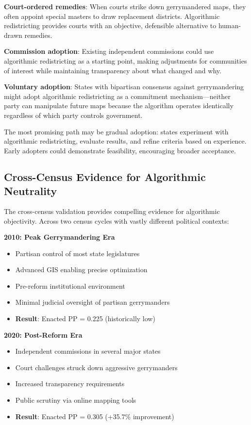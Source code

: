 \textbf{Court-ordered remedies}: When courts strike down gerrymandered maps, they often appoint special masters to draw replacement districts. Algorithmic redistricting provides courts with an objective, defensible alternative to human-drawn remedies.

\textbf{Commission adoption}: Existing independent commissions could use algorithmic redistricting as a starting point, making adjustments for communities of interest while maintaining transparency about what changed and why.

\textbf{Voluntary adoption}: States with bipartisan consensus against gerrymandering might adopt algorithmic redistricting as a commitment mechanism—neither party can manipulate future maps because the algorithm operates identically regardless of which party controls government.

The most promising path may be gradual adoption: states experiment with algorithmic redistricting, evaluate results, and refine criteria based on experience. Early adopters could demonstrate feasibility, encouraging broader acceptance.

\subsection{Cross-Census Evidence for Algorithmic Neutrality}

The cross-census validation provides compelling evidence for algorithmic objectivity. Across two census cycles with vastly different political contexts:

\textbf{2010: Peak Gerrymandering Era}
\begin{itemize}
\item Partisan control of most state legislatures
\item Advanced GIS enabling precise optimization
\item Pre-reform institutional environment
\item Minimal judicial oversight of partisan gerrymanders
\item \textbf{Result}: Enacted PP = 0.225 (historically low)
\end{itemize}

\textbf{2020: Post-Reform Era}
\begin{itemize}
\item Independent commissions in several major states
\item Court challenges struck down aggressive gerrymanders
\item Increased transparency requirements
\item Public scrutiny via online mapping tools
\item \textbf{Result}: Enacted PP = 0.305 (+35.7\% improvement)
\end{itemize}

